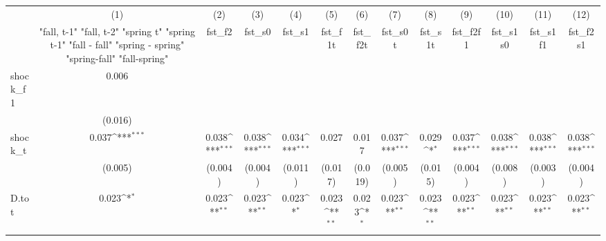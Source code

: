 {
\def\sym#1{\ifmmode^{#1}\else\(^{#1}\)\fi}
\begin{tabular}{l*{12}{c}}
\toprule
            &\multicolumn{1}{c}{(1)}&\multicolumn{1}{c}{(2)}&\multicolumn{1}{c}{(3)}&\multicolumn{1}{c}{(4)}&\multicolumn{1}{c}{(5)}&\multicolumn{1}{c}{(6)}&\multicolumn{1}{c}{(7)}&\multicolumn{1}{c}{(8)}&\multicolumn{1}{c}{(9)}&\multicolumn{1}{c}{(10)}&\multicolumn{1}{c}{(11)}&\multicolumn{1}{c}{(12)}\\
            &\multicolumn{1}{c}{  "fall, t-1" "fall, t-2" "spring t" "spring t-1"  "fall - fall" "spring - spring" "spring-fall" "fall-spring" }&\multicolumn{1}{c}{fst\_f2}&\multicolumn{1}{c}{fst\_s0}&\multicolumn{1}{c}{fst\_s1}&\multicolumn{1}{c}{fst\_f1t}&\multicolumn{1}{c}{fst\_f2t}&\multicolumn{1}{c}{fst\_s0t}&\multicolumn{1}{c}{fst\_s1t}&\multicolumn{1}{c}{fst\_f2f1}&\multicolumn{1}{c}{fst\_s1s0}&\multicolumn{1}{c}{fst\_s1f1}&\multicolumn{1}{c}{fst\_f2s1}\\
\midrule
shock\_f1    &       0.006         &                     &                     &                     &                     &                     &                     &                     &                     &                     &                     &                     \\
            &     (0.016)         &                     &                     &                     &                     &                     &                     &                     &                     &                     &                     &                     \\
\addlinespace
shock\_t     &       0.037\sym{***}&       0.038\sym{***}&       0.038\sym{***}&       0.034\sym{***}&       0.027         &       0.017         &       0.037\sym{***}&       0.029\sym{*}  &       0.037\sym{***}&       0.038\sym{***}&       0.038\sym{***}&       0.038\sym{***}\\
            &     (0.005)         &     (0.004)         &     (0.004)         &     (0.011)         &     (0.017)         &     (0.019)         &     (0.005)         &     (0.015)         &     (0.004)         &     (0.008)         &     (0.003)         &     (0.004)         \\
\addlinespace
D.tot       &       0.023\sym{*}  &       0.023\sym{**} &       0.023\sym{**} &       0.023\sym{*}  &       0.023\sym{**} &       0.023\sym{*}  &       0.023\sym{**} &       0.023\sym{**} &       0.023\sym{**} &       0.023\sym{**} &       0.023\sym{**} &       0.023\sym{**} \\

\end{tabular}}
